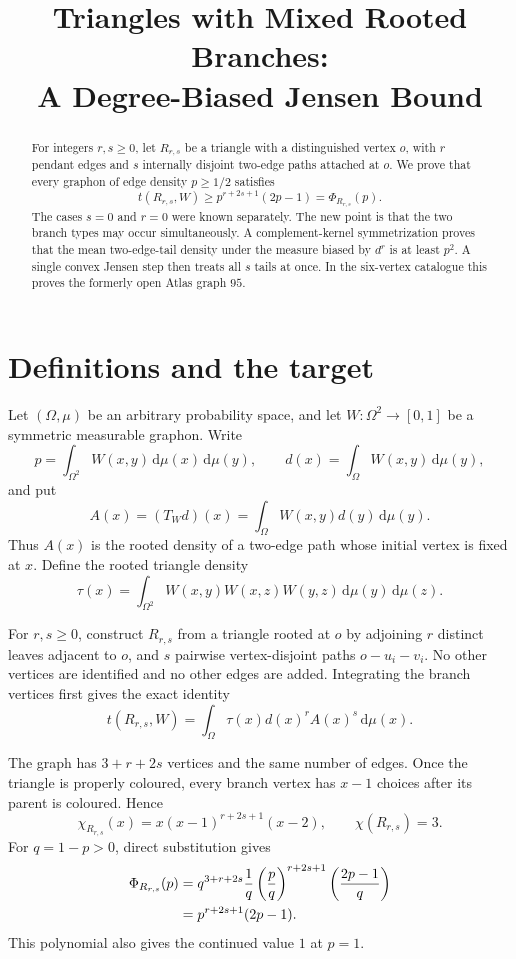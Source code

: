 \documentclass[11pt]{article}
\title{Triangles with Mixed Rooted Branches:\\
A Degree-Biased Jensen Bound}
\author{}
\date{}
\newcommand{\dd}{\,\mathrm d}
\begin{document}
\maketitle

\begin{abstract}
For integers $r,s\geq0$, let $R_{r,s}$ be a triangle with a distinguished
vertex $o$, with $r$ pendant edges and $s$ internally disjoint two-edge
paths attached at $o$.  We prove that every graphon of edge density
$p\geq1/2$ satisfies
\[
 t(R_{r,s},W)\geq p^{r+2s+1}(2p-1)=\Phi_{R_{r,s}}(p).
\]
The cases $s=0$ and $r=0$ were known separately.  The new point is that the
two branch types may occur simultaneously.  A complement-kernel
symmetrization proves that the mean two-edge-tail density under the measure
biased by $d^r$ is at least $p^2$.  A single convex Jensen step then treats
all $s$ tails at once.  In the six-vertex catalogue this proves the formerly
open Atlas graph $95$.
\end{abstract}


\section{Definitions and the target}

Let $(\Omega,\mu)$ be an arbitrary probability space, and let
$W\colon\Omega^2\to[0,1]$ be a symmetric measurable graphon.  Write
\[
 p=\int_{\Omega^2}W(x,y)\dd\mu(x)\dd\mu(y),
 \qquad
 d(x)=\int_\Omega W(x,y)\dd\mu(y),
\]
and put
\[
 A(x)=(T_Wd)(x)=\int_\Omega W(x,y)d(y)\dd\mu(y).
\]
Thus $A(x)$ is the rooted density of a two-edge path whose initial vertex
is fixed at $x$.  Define the rooted triangle density
\[
 \tau(x)=\int_{\Omega^2}
 W(x,y)W(x,z)W(y,z)\dd\mu(y)\dd\mu(z).
\]

For $r,s\geq0$, construct $R_{r,s}$ from a triangle rooted at $o$ by
adjoining $r$ distinct leaves adjacent to $o$, and $s$ pairwise
vertex-disjoint paths $o-u_i-v_i$.  No other vertices are identified and no
other edges are added.  Integrating the branch vertices first gives the
exact identity
\begin{equation}
 t(R_{r,s},W)=\int_\Omega \tau(x)d(x)^rA(x)^s\dd\mu(x).
 \label{eq:density-identity}
\end{equation}

The graph has $3+r+2s$ vertices and the same number of edges.  Once the
triangle is properly coloured, every branch vertex has $x-1$ choices after
its parent is coloured.  Hence
\[
 \chi_{R_{r,s}}(x)=x(x-1)^{r+2s+1}(x-2),
 \qquad \chi(R_{r,s})=3.
\]
For $q=1-p>0$, direct substitution gives
\begin{align}
 \Phi_{R_{r,s}}(p)
 &=q^{3+r+2s}\frac1q
   \left(\frac pq\right)^{r+2s+1}
   \left(\frac{2p-1}{q}\right)
 \notag\\
 &=p^{r+2s+1}(2p-1).
 \label{eq:target}
\end{align}
This polynomial also gives the continued value $1$ at $p=1$.
\end{document}
